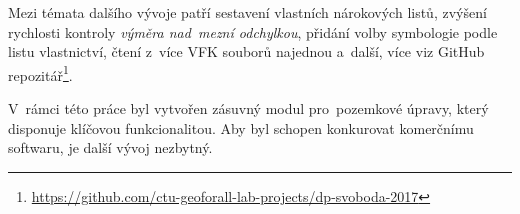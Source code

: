 Mezi témata dalšího vývoje patří sestavení vlastních nárokových listů, zvýšení rychlosti kontroly \textit{výměra nad~mezní odchylkou}, přidání volby symbologie podle listu vlastnictví, čtení z~více VFK souborů najednou a~další, více viz GitHub repozitář\footnote{\url{https://github.com/ctu-geoforall-lab-projects/dp-svoboda-2017}}.

V~rámci této práce byl vytvořen zásuvný modul pro~pozemkové úpravy, který disponuje klíčovou funkcionalitou. Aby byl schopen konkurovat komerčnímu softwaru, je další vývoj nezbytný.
